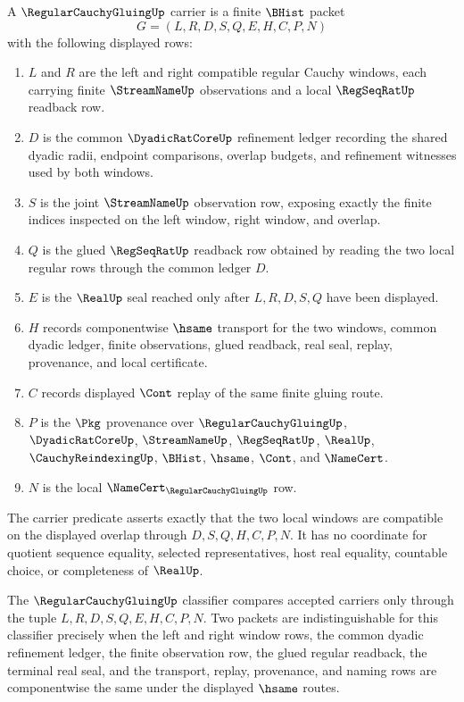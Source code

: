 \begin{definition}
\label{def:regular-cauchy-gluing-carrier}
A $\RegularCauchyGluingUp$ carrier is a finite $\BHist$ packet
$$
G=(L,R,D,S,Q,E,H,C,P,N)
$$
with the following displayed rows:
\begin{enumerate}
\item $L$ and $R$ are the left and right compatible regular Cauchy windows, each carrying finite $\StreamNameUp$ observations and a local $\RegSeqRatUp$ readback row.
\item $D$ is the common $\DyadicRatCoreUp$ refinement ledger recording the shared dyadic radii, endpoint comparisons, overlap budgets, and refinement witnesses used by both windows.
\item $S$ is the joint $\StreamNameUp$ observation row, exposing exactly the finite indices inspected on the left window, right window, and overlap.
\item $Q$ is the glued $\RegSeqRatUp$ readback row obtained by reading the two local regular rows through the common ledger $D$.
\item $E$ is the $\RealUp$ seal reached only after $L,R,D,S,Q$ have been displayed.
\item $H$ records componentwise $\hsame$ transport for the two windows, common dyadic ledger, finite observations, glued readback, real seal, replay, provenance, and local certificate.
\item $C$ records displayed $\Cont$ replay of the same finite gluing route.
\item $P$ is the $\Pkg$ provenance over $\RegularCauchyGluingUp$, $\DyadicRatCoreUp$, $\StreamNameUp$, $\RegSeqRatUp$, $\RealUp$, $\CauchyReindexingUp$, $\BHist$, $\hsame$, $\Cont$, and $\NameCert$.
\item $N$ is the local $\NameCert_{\RegularCauchyGluingUp}$ row.
\end{enumerate}
The carrier predicate asserts exactly that the two local windows are compatible on the displayed overlap through $D,S,Q,H,C,P,N$. It has no coordinate for quotient sequence equality, selected representatives, host real equality, countable choice, or completeness of $\RealUp$.
\end{definition}

\begin{definition}
\label{def:regular-cauchy-gluing-classifier}
The $\RegularCauchyGluingUp$ classifier compares accepted carriers only through the tuple $L,R,D,S,Q,E,H,C,P,N$. Two packets are indistinguishable for this classifier precisely when the left and right window rows, the common dyadic refinement ledger, the finite observation row, the glued regular readback, the terminal real seal, and the transport, replay, provenance, and naming rows are componentwise the same under the displayed $\hsame$ routes.
\end{definition}

